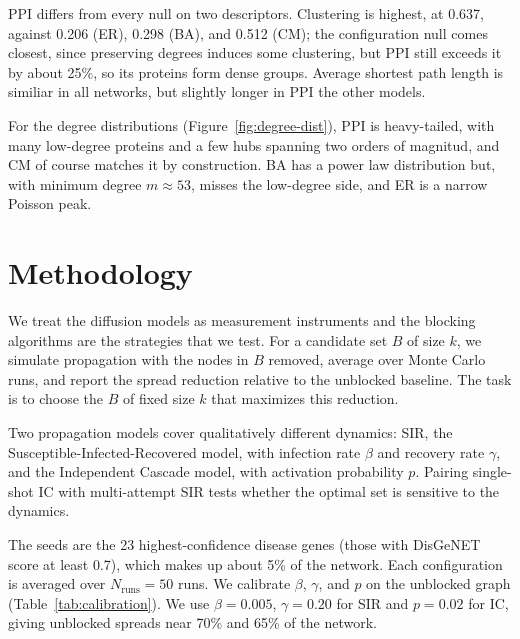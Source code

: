 \documentclass[9pt,a4paper,twocolumn,twoside]{tau-class/tau}
\begin{document}
PPI differs from every null on two descriptors. Clustering is highest, at 0.637, against 0.206 (ER), 0.298 (BA), and 0.512 (CM); the configuration null comes closest, since preserving degrees induces some clustering, but PPI still exceeds it by about 25\%, so its proteins form dense groups. Average shortest path length is similiar in all networks, but slightly longer in PPI the other models.

For the degree distributions (Figure~\ref{fig:degree-dist}), PPI is heavy-tailed, with many low-degree proteins and a few hubs spanning two orders of magnitud, and CM of course matches it by construction. BA has a power law distribution but, with minimum degree $m \approx 53$, misses the low-degree side, and ER is a narrow Poisson peak.

\section{Methodology}

We treat the diffusion models as measurement instruments and the blocking algorithms are the strategies that we test. For a candidate set $B$ of size $k$, we simulate propagation with the nodes in $B$ removed, average over Monte Carlo runs, and report the spread reduction relative to the unblocked baseline. The task is to choose the $B$ of fixed size $k$ that maximizes this reduction.

Two propagation models cover qualitatively different dynamics: SIR, the Susceptible-Infected-Recovered model, with infection rate $\beta$ and recovery rate $\gamma$, and the Independent Cascade model, with activation probability $p$. Pairing single-shot IC with multi-attempt SIR tests whether the optimal set is sensitive to the dynamics.

The seeds are the 23 highest-confidence disease genes (those with DisGeNET score at least 0.7), which makes up about 5\% of the network. Each configuration is averaged over $N_{\mathrm{runs}} = 50$ runs. We calibrate $\beta$, $\gamma$, and $p$ on the unblocked graph (Table~\ref{tab:calibration}). We use $\beta = 0.005$, $\gamma = 0.20$ for SIR and $p = 0.02$ for IC, giving unblocked spreads near 70\% and 65\% of the network.
\end{document}
